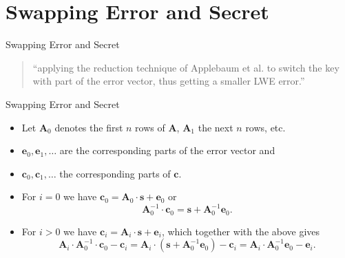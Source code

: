 \documentclass[presentation,smaller]{beamer}
\renewcommand{\vec}[1]{\ensuremath{\mathbf{#1}}\xspace}
\begin{document}
\section{Swapping Error and Secret}
\label{sec:orgheadline30}
\begin{frame}[label={sec:orgheadline26}]{Swapping Error and Secret}
\begin{quote}
“applying the reduction technique of Applebaum et al. to switch the key with part of the error vector, thus getting a smaller LWE error.”
\end{quote}
\end{frame}

\begin{frame}[label={sec:orgheadline27}]{Swapping Error and Secret}
\begin{itemize}
\item Let \(\vec{A}_0\) denotes the first \(n\) rows of \(\vec{A}\), \(\vec{A}_1\) the next \(n\) rows, etc.

\item \(\vec{e}_0, \vec{e}_1, \dots\) are the corresponding parts of the error vector and

\item \(\vec{c}_0 , \vec{c}_1, \dots\) the corresponding parts of \(\vec{c}\).

\item For \(i=0\) we have \(\vec{c}_0 = \vec{A}_0 \cdot \vec{s}  + \vec{e}_0\) or \[\vec{A}_0^{-1} \cdot \vec{c}_0 = \vec{s} + \vec{A}_0^{-1} \vec{e}_0.\]

\item For \(i > 0\) we have \(\vec{c}_i = \vec{A}_i \cdot \vec{s} + \vec{e}_i\), which together with the above gives \[\vec{A}_i ⋅ \vec{A}_0^{-1} ⋅ \vec{c}_0 - \vec{c}_i = \vec{A}_i ⋅ (\vec{s} + \vec{A}_0^{-1} \vec{e}_0) - \vec{c}_i =  \vec{A}_i ⋅ \vec{A}_0^{-1} \vec{e}_0 - \vec{e}_i.\]
\end{itemize}
\end{frame}
\end{document}
